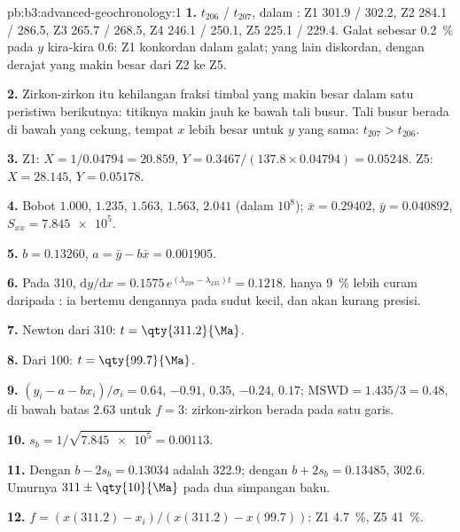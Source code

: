 \begin{solution}{pb:b3:advanced-geochronology:1}
\textbf{1.} $t_{206}$ / $t_{207}$, dalam \unit{\Ma}: Z1 301.9 / 302.2, Z2 284.1 /
286.5, Z3 265.7 / 268.5, Z4 246.1 / 250.1, Z5 225.1 / 229.4. Galat sebesar
\qty{0.2}{\percent} pada $y$ kira-kira \qty{0.6}{\Ma}: Z1 konkordan dalam
galat; yang lain diskordan, dengan derajat yang makin besar dari Z2 ke Z5.

\textbf{2.} Zirkon-zirkon itu kehilangan fraksi timbal yang makin besar dalam satu
peristiwa berikutnya: titiknya makin jauh ke bawah tali busur. Tali busur berada di bawah
 yang cekung, tempat $x$ lebih besar untuk $y$ yang sama: $t_{207} > t_{206}$.

\textbf{3.} Z1: $X = 1/0.04794 = 20.859$, $Y = 0.3467/(137.8\times0.04794) =
0.05248$. Z5: $X = 28.145$, $Y = 0.05178$.

\textbf{4.} Bobot $1.000$, $1.235$, $1.563$, $1.563$, $2.041$ (dalam
$10^8$); $\bar x = 0.29402$, $\bar y = 0.040892$, $S_{xx} = \num{7.845e5}$.

\textbf{5.} $b = 0.13260$, $a = \bar y - b\bar x = 0.001905$.

\textbf{6.} Pada \qty{310}{\Ma}, $\mathrm dy/\mathrm dx = 0.1575\,
e^{(\lambda_{238} - \lambda_{235})t} = 0.1218$.  hanya
\qty{9}{\percent} lebih curam daripada : ia bertemu dengannya pada sudut kecil,
dan  akan kurang presisi.

\textbf{7.} Newton dari \qty{310}{\Ma}: $t = \qty{311.2}{\Ma}$.

\textbf{8.} Dari \qty{100}{\Ma}: $t = \qty{99.7}{\Ma}$.

\textbf{9.} $(y_i - a - bx_i)/\sigma_i = 0.64$, $-0.91$, $0.35$, $-0.24$,
$0.17$; $\mathrm{MSWD} = 1.435/3 = 0.48$, di bawah batas $2.63$ untuk $f = 3$:
zirkon-zirkon berada pada satu garis.

\textbf{10.} $s_b = 1/\sqrt{\num{7.845e5}} = 0.00113$.

\textbf{11.} Dengan $b - 2s_b = 0.13034$  adalah
\qty{322.9}{\Ma}; dengan $b + 2s_b = 0.13485$, \qty{302.6}{\Ma}. Umurnya
$311 \pm \qty{10}{\Ma}$ pada dua simpangan baku.

\textbf{12.} $f = (x(311.2) - x_i)/(x(311.2) - x(99.7))$: Z1 \qty{4.7}{\percent},
Z5 \qty{41}{\percent}.


\end{solution}
